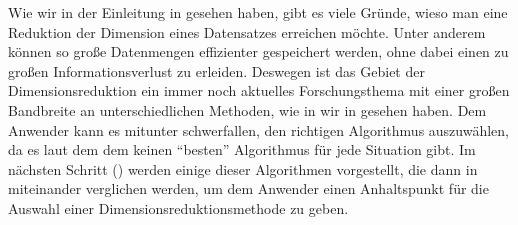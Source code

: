 Wie wir in der Einleitung in  gesehen haben, gibt es viele Gründe, wieso man
eine Reduktion der Dimension eines Datensatzes erreichen möchte. Unter anderem können so große
Datenmengen effizienter gespeichert werden, ohne dabei einen zu großen Informationsverlust zu
erleiden. Deswegen ist das Gebiet der Dimensionsreduktion ein immer noch aktuelles Forschungsthema
mit einer großen Bandbreite an unterschiedlichen Methoden, wie in wir in
 gesehen haben. Dem Anwender kann es mitunter schwerfallen,
den richtigen Algorithmus auszuwählen, da es laut dem dem  \parencite{Wolpert.1997} keinen \enquote{besten} Algorithmus für jede Situation gibt. Im nächsten
Schritt () werden einige dieser Algorithmen vorgestellt, die dann in
 miteinander verglichen werden, um dem Anwender einen Anhaltspunkt für die
Auswahl einer Dimensionsreduktionsmethode zu geben.